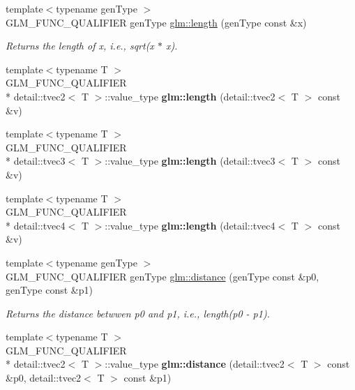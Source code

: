 \begin{DoxyCompactItemize}
\item 
{\footnotesize template$<$typename gen\-Type $>$ }\\G\-L\-M\-\_\-\-F\-U\-N\-C\-\_\-\-Q\-U\-A\-L\-I\-F\-I\-E\-R gen\-Type \hyperlink{group__core__func__geometric_ga282360c8bb80b80d3c7f5bc00766d873}{glm\-::length} (gen\-Type const \&x)
\begin{DoxyCompactList}\small\item\em Returns the length of x, i.\-e., sqrt(x $\ast$ x). \end{DoxyCompactList}\item 
\hypertarget{namespaceglm_a9b274882b38ddb0bd507c845e41e7cb5}{{\footnotesize template$<$typename T $>$ }\\G\-L\-M\-\_\-\-F\-U\-N\-C\-\_\-\-Q\-U\-A\-L\-I\-F\-I\-E\-R \\*
detail\-::tvec2$<$ T $>$\-::value\-\_\-type {\bfseries glm\-::length} (detail\-::tvec2$<$ T $>$ const \&v)}\label{namespaceglm_a9b274882b38ddb0bd507c845e41e7cb5}

\item 
\hypertarget{namespaceglm_a191bf91c699b38f4b7807e23fd809e97}{{\footnotesize template$<$typename T $>$ }\\G\-L\-M\-\_\-\-F\-U\-N\-C\-\_\-\-Q\-U\-A\-L\-I\-F\-I\-E\-R \\*
detail\-::tvec3$<$ T $>$\-::value\-\_\-type {\bfseries glm\-::length} (detail\-::tvec3$<$ T $>$ const \&v)}\label{namespaceglm_a191bf91c699b38f4b7807e23fd809e97}

\item 
\hypertarget{namespaceglm_a0668efb90859b9cb66f31889cdf04aef}{{\footnotesize template$<$typename T $>$ }\\G\-L\-M\-\_\-\-F\-U\-N\-C\-\_\-\-Q\-U\-A\-L\-I\-F\-I\-E\-R \\*
detail\-::tvec4$<$ T $>$\-::value\-\_\-type {\bfseries glm\-::length} (detail\-::tvec4$<$ T $>$ const \&v)}\label{namespaceglm_a0668efb90859b9cb66f31889cdf04aef}

\item 
{\footnotesize template$<$typename gen\-Type $>$ }\\G\-L\-M\-\_\-\-F\-U\-N\-C\-\_\-\-Q\-U\-A\-L\-I\-F\-I\-E\-R gen\-Type \hyperlink{group__core__func__geometric_ga3fac0e61144f60184d961dd156709dd3}{glm\-::distance} (gen\-Type const \&p0, gen\-Type const \&p1)
\begin{DoxyCompactList}\small\item\em Returns the distance betwwen p0 and p1, i.\-e., length(p0 -\/ p1). \end{DoxyCompactList}\item 
\hypertarget{namespaceglm_a02e1b17b70ee3ddd270c01aea45e5e82}{{\footnotesize template$<$typename T $>$ }\\G\-L\-M\-\_\-\-F\-U\-N\-C\-\_\-\-Q\-U\-A\-L\-I\-F\-I\-E\-R \\*
detail\-::tvec2$<$ T $>$\-::value\-\_\-type {\bfseries glm\-::distance} (detail\-::tvec2$<$ T $>$ const \&p0, detail\-::tvec2$<$ T $>$ const \&p1)}\label{namespaceglm_a02e1b17b70ee3ddd270c01aea45e5e82}


\end{DoxyCompactItemize}
